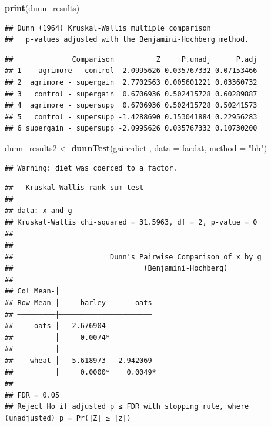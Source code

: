 \documentclass[
]{article}
\newenvironment{Shaded}{\begin{snugshade}}{\end{snugshade}}
\newcommand{\AttributeTok}[1]{\textcolor[rgb]{0.13,0.29,0.53}{#1}}
\newcommand{\FunctionTok}[1]{\textcolor[rgb]{0.13,0.29,0.53}{\textbf{#1}}}
\newcommand{\NormalTok}[1]{#1}
\newcommand{\OtherTok}[1]{\textcolor[rgb]{0.56,0.35,0.01}{#1}}
\newcommand{\SpecialCharTok}[1]{\textcolor[rgb]{0.81,0.36,0.00}{\textbf{#1}}}
\newcommand{\StringTok}[1]{\textcolor[rgb]{0.31,0.60,0.02}{#1}}
\begin{document}
\begin{Shaded}
\begin{Highlighting}[]
\FunctionTok{print}\NormalTok{(dunn\_results)}
\end{Highlighting}
\end{Shaded}

\begin{verbatim}
## Dunn (1964) Kruskal-Wallis multiple comparison
##   p-values adjusted with the Benjamini-Hochberg method.
\end{verbatim}

\begin{verbatim}
##              Comparison          Z     P.unadj      P.adj
## 1    agrimore - control  2.0995626 0.035767332 0.07153466
## 2  agrimore - supergain  2.7702563 0.005601221 0.03360732
## 3   control - supergain  0.6706936 0.502415728 0.60289887
## 4  agrimore - supersupp  0.6706936 0.502415728 0.50241573
## 5   control - supersupp -1.4288690 0.153041884 0.22956283
## 6 supergain - supersupp -2.0995626 0.035767332 0.10730200
\end{verbatim}

\begin{Shaded}
\begin{Highlighting}[]
\NormalTok{dunn\_results2 }\OtherTok{\textless{}{-}} \FunctionTok{dunnTest}\NormalTok{(gain}\SpecialCharTok{\textasciitilde{}}\NormalTok{diet , }\AttributeTok{data =}\NormalTok{ facdat, }\AttributeTok{method =} \StringTok{"bh"}\NormalTok{)}
\end{Highlighting}
\end{Shaded}

\begin{verbatim}
## Warning: diet was coerced to a factor.
\end{verbatim}

\begin{verbatim}
##   Kruskal-Wallis rank sum test
## 
## data: x and g
## Kruskal-Wallis chi-squared = 31.5963, df = 2, p-value = 0
## 
## 
##                       Dunn's Pairwise Comparison of x by g                      
##                               (Benjamini-Hochberg)                              
## 
## Col Mean-│
## Row Mean │     barley       oats
## ─────────┼──────────────────────
##     oats │   2.676904
##          │     0.0074*
##          │
##    wheat │   5.618973   2.942069
##          │     0.0000*    0.0049*
## 
## FDR = 0.05
## Reject Ho if adjusted p ≤ FDR with stopping rule, where (unadjusted) p = Pr(|Z| ≥ |z|)
\end{verbatim}
\end{document}
